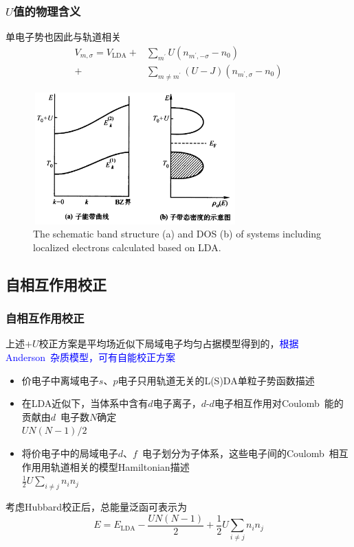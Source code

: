 {\frame
{
	\frametitle{$U$值的物理含义}
	单电子势也因此与轨道相关
	\begin{displaymath}
		\begin{aligned}
			V_{m,\sigma}=V_{\mathrm{LDA}}+&\sum_{m^{\prime}}U(n_{m^{\prime},-\sigma}-n_0)\\
			+&\sum_{m\neq m^{\prime}}(U-J)(n_{m^{\prime},\sigma}-n_0)
		\end{aligned}
	\end{displaymath}
\begin{figure}[h!]
\centering
\vspace*{-0.25in}
\includegraphics[height=2.0in,width=3.1in,viewport=0 0 1250 880,clip]{Figures/LDA_U-4.png}
\caption{\tiny \textrm{The schematic band structure (a) and DOS (b) of systems including localized electrons calculated based on LDA.}}%
\label{LDA_U-4}
\end{figure}
}

\subsection{自相互作用校正}
\frame
{
	\frametitle{自相互作用校正}
	上述$+U$校正方案是平均场近似下局域电子均匀占据模型得到的，\textcolor{blue}{根据\textrm{Anderson~}杂质模型，可有自能校正方案}
	\begin{itemize}
		\item 价电子中离域电子$s$、$p$电子只用轨道无关的\textrm{L(S)DA}单粒子势函数描述
		\item 在\textrm{LDA}近似下，当体系中含有$d$电子离子，$d$-$d$电子相互作用对\textrm{Coulomb~}能的贡献由$d$~电子数$N$确定\\$UN(N-1)/2$
		\item 将价电子中的局域电子$d$、$f$~电子划分为子体系，这些电子间的\textrm{Coulomb}~相互作用用轨道相关的模型\textrm{Hamiltonian}描述\\$\frac12U\sum\limits_{i\neq j}n_in_j$
	\end{itemize}
	考虑\textrm{Hubbard}校正后，总能量泛函可表示为
	$$E=E_{\mathrm{LDA}}-\frac{UN(N-1)}2+\frac12U\sum\limits_{i\neq j}n_in_j$$
}

}
